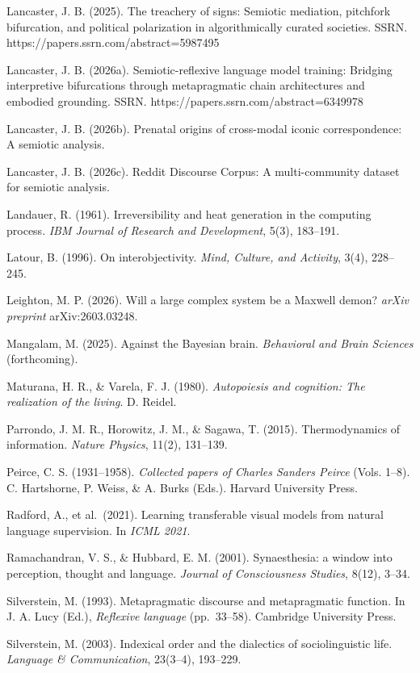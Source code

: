 \documentclass[
  11pt]{article}
\begin{document}
Lancaster, J. B. (2025). The treachery of signs: Semiotic mediation,
pitchfork bifurcation, and political polarization in algorithmically
curated societies. SSRN. https://papers.ssrn.com/abstract=5987495

Lancaster, J. B. (2026a). Semiotic-reflexive language model training:
Bridging interpretive bifurcations through metapragmatic chain
architectures and embodied grounding. SSRN.
https://papers.ssrn.com/abstract=6349978

Lancaster, J. B. (2026b). Prenatal origins of cross-modal iconic
correspondence: A semiotic analysis.

Lancaster, J. B. (2026c). Reddit Discourse Corpus: A multi-community
dataset for semiotic analysis.

Landauer, R. (1961). Irreversibility and heat generation in the
computing process. \emph{IBM Journal of Research and Development}, 5(3),
183--191.

Latour, B. (1996). On interobjectivity. \emph{Mind, Culture, and
Activity}, 3(4), 228--245.

Leighton, M. P. (2026). Will a large complex system be a Maxwell demon?
\emph{arXiv preprint} arXiv:2603.03248.

Mangalam, M. (2025). Against the Bayesian brain. \emph{Behavioral and
Brain Sciences} (forthcoming).

Maturana, H. R., \& Varela, F. J. (1980). \emph{Autopoiesis and
cognition: The realization of the living}. D. Reidel.

Parrondo, J. M. R., Horowitz, J. M., \& Sagawa, T. (2015).
Thermodynamics of information. \emph{Nature Physics}, 11(2), 131--139.

Peirce, C. S. (1931--1958). \emph{Collected papers of Charles Sanders
Peirce} (Vols. 1--8). C. Hartshorne, P. Weiss, \& A. Burks (Eds.).
Harvard University Press.

Radford, A., et al.~(2021). Learning transferable visual models from
natural language supervision. In \emph{ICML 2021}.

Ramachandran, V. S., \& Hubbard, E. M. (2001). Synaesthesia: a window
into perception, thought and language. \emph{Journal of Consciousness
Studies}, 8(12), 3--34.

Silverstein, M. (1993). Metapragmatic discourse and metapragmatic
function. In J. A. Lucy (Ed.), \emph{Reflexive language} (pp.~33--58).
Cambridge University Press.

Silverstein, M. (2003). Indexical order and the dialectics of
sociolinguistic life. \emph{Language \& Communication}, 23(3--4),
193--229.
\end{document}
